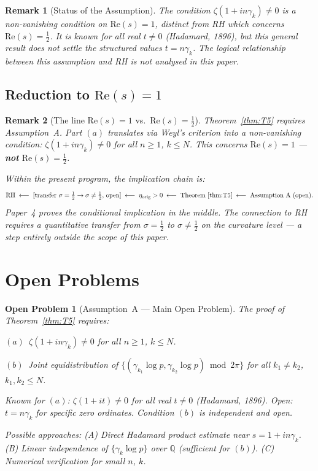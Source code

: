 \documentclass[11pt]{article}
\newtheorem*{remark}{Remark}
\newtheorem*{openproblem}{Open Problem}
\newcommand{\etaorig}{\eta_{\mathrm{orig}}}
\begin{document}
\begin{remark}[Status of the Assumption]
The condition $\zeta(1+in\gamma_k)\neq 0$ is a non-vanishing condition
on $\mathrm{Re}(s)=1$, distinct from RH which concerns
$\mathrm{Re}(s)=\tfrac{1}{2}$.
It is known for all real $t\neq 0$ (Hadamard, 1896), but this general
result does not settle the structured values $t = n\gamma_k$.
The logical relationship between this assumption and RH is not analysed
in this paper.
\end{remark}

\subsection{Reduction to $\mathrm{Re}(s) = 1$}

\begin{remark}[The line $\mathrm{Re}(s)=1$ vs.\ $\mathrm{Re}(s)=\tfrac{1}{2}$]
Theorem~\ref{thm:T5} requires Assumption~A.
Part $(a)$ translates via Weyl's criterion into a non-vanishing condition:
$\zeta(1+in\gamma_k)\neq 0$ for all $n\geq 1$, $k\leq N$.
This concerns $\mathrm{Re}(s)=1$ --- \textbf{not} $\mathrm{Re}(s)=\tfrac{1}{2}$.

Within the present program, the implication chain is:
\[
\mathrm{RH}
\;\longleftarrow\;
[\text{transfer } \sigma=\tfrac{1}{2}\to\sigma\neq\tfrac{1}{2},\,\text{open}]
\;\longleftarrow\; \etaorig > 0
\;\longleftarrow\; \text{Theorem~\ref{thm:T5}}
\;\longleftarrow\; \text{Assumption~A (open)}.
\]
Paper~4 proves the conditional implication in the middle.
The connection to RH requires a quantitative transfer from
$\sigma=\tfrac{1}{2}$ to $\sigma\neq\tfrac{1}{2}$ on the curvature level
--- a step entirely outside the scope of this paper.
\end{remark}

\section{Open Problems}

\begin{openproblem}[Assumption~A --- Main Open Problem]
The proof of Theorem~\ref{thm:T5} requires:

$(a)$~$\zeta(1+in\gamma_k)\neq 0$ for all $n\geq 1$, $k\leq N$.

$(b)$~Joint equidistribution of
$\{(\gamma_{k_1}\log p,\gamma_{k_2}\log p)\bmod 2\pi\}$
for all $k_1\neq k_2$, $k_1,k_2\leq N$.

Known for $(a)$: $\zeta(1+it)\neq 0$ for all real $t\neq 0$
(Hadamard, 1896).
Open: $t = n\gamma_k$ for specific zero ordinates.
Condition $(b)$ is independent and open.

Possible approaches:
(A) Direct Hadamard product estimate near $s = 1+in\gamma_k$.
(B) Linear independence of $\{\gamma_k\log p\}$ over $\mathbb{Q}$
  (sufficient for $(b)$).
(C) Numerical verification for small $n$, $k$.
\end{openproblem}
\end{document}
